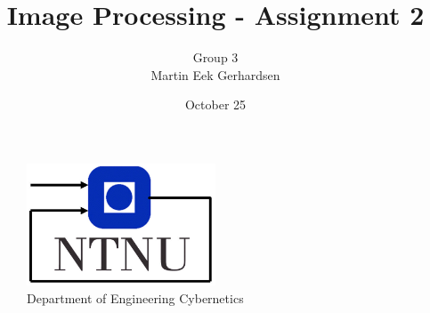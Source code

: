 \documentclass[11pt, a4paper, USenglish]{article} %
\begin{document}
\title{Image Processing - Assignment 2}
\author{Group 3\\Martin Eek Gerhardsen}
\date{October 25}
\begin{titlepage}
    \maketitle
    \begin{figure}
    \centering
    \includegraphics[width=0.5\textwidth]{figures/itk_ntnu}\\
    Department of Engineering Cybernetics
    \end{figure}
    \thispagestyle{empty}
\end{titlepage}

\newpage
\tableofcontents
\thispagestyle{empty} %

\newpage
\setcounter{page}{1}



\newpage
{}
\label{sec:bibliography}
\end{document}
